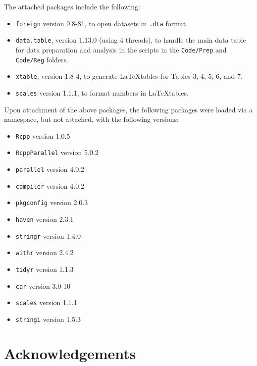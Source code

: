 \documentclass[11pt]{paper}
\begin{document}
The attached packages include the following:

\begin{itemize}

\item \texttt{foreign} version 0.8-81, to open datasets in \texttt{.dta} format. 

\item \texttt{data.table}, version 1.13.0 (using 4 threads), 
to handle the main data table for 
data preparation and analysis 
in the scripts in the \texttt{Code/Prep} and \texttt{Code/Reg} folders. 

\item \texttt{xtable}, version 1.8-4, to generate \LaTeX tables for 
Tables 3, 4, 5, 6, and 7.   

\item \texttt{scales} version 1.1.1, to format numbers in \LaTeX tables.


\end{itemize}



Upon attachment of the above packages, 
the following packages were loaded via a namespace, but not attached,
with the following versions:

\begin{itemize}

\item \texttt{Rcpp} version 1.0.5
\item \texttt{RcppParallel} version 5.0.2
\item \texttt{parallel} version 4.0.2
\item \texttt{compiler} version 4.0.2
\item \texttt{pkgconfig} version 2.0.3
\item \texttt{haven} version 2.3.1
\item \texttt{stringr} version 1.4.0
\item \texttt{withr} version 2.4.2    
\item \texttt{tidyr} version 1.1.3       
\item \texttt{car} version 3.0-10        
\item \texttt{scales} version 1.1.1         
\item \texttt{stringi} version 1.5.3    

\end{itemize}


\section*{Acknowledgements}
\end{document}

